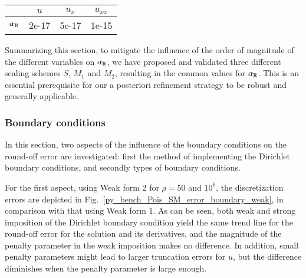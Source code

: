 \documentclass[review,3p]{elsarticle}
\begin{document}
\begin{table}[!ht]
\centering
\begin{tabular}{c c c c}
\hline
 & $u$ & $u_x$ & $u_{xx}$ \\ \hline 
$\alpha_{\rm R}$ & 2e-17 & 5e-17 & 1e-15 \\ \hline
\end{tabular}
\label{value_alpha_R_generalized}
\end{table}


Summarizing this section, to mitigate the influence of the order of magnitude of the different variables on $\alpha_{\rm R}$, we have proposed and validated three different scaling schemes $S$, $M_1$ and $M_2$, resulting in the common values for $\alpha_{\rm R}$.
This is an essential prerequisite for our a posteriori refinement strategy to be robust and generally applicable.

\subsubsection{Boundary conditions}	\label{section_BC}

In this section, two aspects of the influence of the boundary conditions on the round-off error are investigated: first the method of implementing the Dirichlet boundary conditions, and secondly types of boundary conditions. 

For the first aspect, using Weak form 2 for $\rho=50$ and $10^6$, the discretization errors are depicted in Fig.~\ref{py_bench_Pois_SM_error_boundary_weak}, in comparison with that using Weak form 1. As can be seen, both weak and strong imposition of the Dirichlet boundary condition yield the same trend line for the round-off error for the solution and its derivatives, and the magnitude of the penalty parameter in the weak imposition makes no difference. In addition, small penalty parameters might lead to larger truncation errors for $u$, but the difference diminishes when the penalty parameter is large enough.
\end{document}
